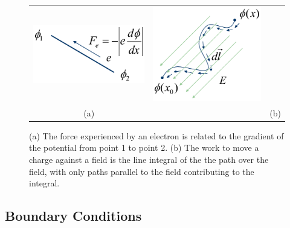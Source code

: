 \begin{figure}[tb]
\begin{center}
\begin{tabular}{ccc}
\includegraphics[width=.25\columnwidth]{mod2-2_ICtech_sld_14} &
\hspace{3cm}
\includegraphics[width=.3\columnwidth]{mod2-2_ICtech_sld_15} \\
(a) & & (b) \\
\end{tabular}
\end{center}
\caption{(a)  The force experienced by an electron is related to the gradient of the potential from point 1 to point 2.  (b)  The work to move a charge against a field is the line integral of the the path over the field, with only paths parallel to the field contributing to the integral.} \label{fig:mod2-2_ICtech_sld_14}
\end{figure}








\subsection{Boundary Conditions}


